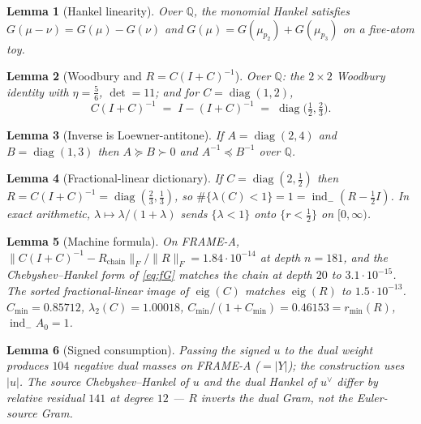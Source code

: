 \documentclass[11pt]{article}
\newtheorem{lemma}{Lemma}
\theoremstyle{remark}
\newcommand{\indm}{\operatorname{ind}_{-}}
\newcommand{\half}{\tfrac12}
\begin{document}
\begin{lemma}[Hankel linearity]\label{lem:hankel}
Over $\mathbb{Q}$, the monomial Hankel satisfies
$G(\mu-\nu)=G(\mu)-G(\nu)$ and $G(\mu)=G(\mu_{p_2})+G(\mu_{p_3})$
on a five-atom toy.
\end{lemma}

\begin{lemma}[Woodbury and $R=C(I+C)^{-1}$]\label{lem:woodbury}
Over $\mathbb{Q}$: the $2\times 2$ Woodbury identity with
$\eta=\tfrac56$, $\det=11$; and for $C=\operatorname{diag}(1,2)$,
\[
  C(I+C)^{-1}
  \;=\;
  I-(I+C)^{-1}
  \;=\;
  \operatorname{diag}\bigl(\tfrac12,\tfrac23\bigr).
\]
\end{lemma}

\begin{lemma}[Inverse is Loewner-antitone]\label{lem:antitone}
If $A=\operatorname{diag}(2,4)$ and $B=\operatorname{diag}(1,3)$
then $A\succeq B\succ 0$ and $A^{-1}\preceq B^{-1}$ over
$\mathbb{Q}$.
\end{lemma}

\begin{lemma}[Fractional-linear dictionary]\label{lem:fl}
If $C=\operatorname{diag}(2,\tfrac12)$ then
$R=C(I+C)^{-1}=\operatorname{diag}(\tfrac23,\tfrac13)$,
so $\#\{\lambda(C)<1\}=1=\indm(R-\half I)$.
In exact arithmetic, $\lambda\mapsto\lambda/(1+\lambda)$
sends $\{\lambda<1\}$ onto $\{r<\half\}$ on $[0,\infty)$.
\end{lemma}

\begin{lemma}[Machine formula]\label{lem:formula}
On FRAME-A, $\|C(I+C)^{-1}-R_{\mathrm{chain}}\|_F/\|R\|_F
=1.84\cdot 10^{-14}$ at depth $n=181$, and the Chebyshev--Hankel
form of \eqref{eq:fG} matches the chain at depth $20$ to
$3.1\cdot 10^{-15}$.
The sorted fractional-linear image of $\operatorname{eig}(C)$
matches $\operatorname{eig}(R)$ to $1.5\cdot 10^{-13}$.
$C_{\min}=0.85712$, $\lambda_2(C)=1.00018$,
$C_{\min}/(1+C_{\min})=0.46153=r_{\min}(R)$, $\indm A_0=1$.
\end{lemma}

\begin{lemma}[Signed consumption]\label{lem:sign}
Passing the signed $u$ to the dual weight produces
$104$ negative dual masses on FRAME-A ($=|Y|$); the
construction uses $|u|$.
The source Chebyshev--Hankel of $u$ and the dual Hankel of
$u^\vee$ differ by relative residual $141$ at degree $12$
--- $R$ inverts the dual Gram, not the Euler-source Gram.
\end{lemma}
\end{document}
